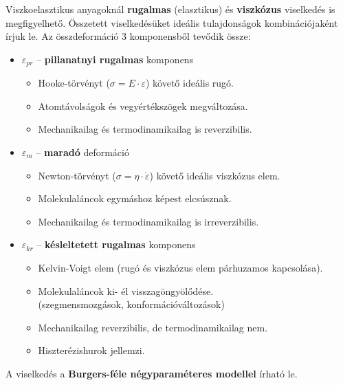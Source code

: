 \documentclass[12pt,a4paper]{article}       %
\newcounter{questionctr}
\newenvironment{question}[1]{
  \refstepcounter{questionctr}
  \begin{tcolorbox}[
    colback=gray!25,
    colbacktitle=red!10!yellow!50,
    enhanced,
    sharp corners,
    boxrule=0mm,
    frame hidden,
    breakable,
    enhanced jigsaw,
    title={\textcolor{black}{\textsc{\# \thequestionctr{} – #1}}}
  ]


}{\end{tcolorbox}}
\begin{document}
\begin{question}{
    Mutassa be a molekulaláncok mechanikai behatásra történő mozgásait. Mutassa
    be részletesen a polimerek deformációkomponenseit! Milyen viselkedési
    jelenségeket mutatnak ezek az anyagok?
  }
  Viszkoelasztikus anyagoknál \textbf{rugalmas} (elasztikus) és
  \textbf{viszkózus} viselkedés is megfigyelhető. Összetett viselkedésüket
  ideális tulajdonságok kombinációjaként írjuk le. Az összdeformáció 3
  komponensből tevődik össze:
  \begin{itemize}
    \item $\varepsilon_{pr}$ – \textbf{pillanatnyi rugalmas} komponens
          \begin{itemize}
            \item Hooke-törvényt ($\sigma = E \cdot \varepsilon$) követő
                  ideális rugó.
            \item Atomtávolságok és vegyértékszögek megváltozása.
            \item Mechanikailag és termodinamikailag is reverzibilis.
          \end{itemize}
    \item $\varepsilon_{m}$ – \textbf{maradó} deformáció
          \begin{itemize}
            \item Newton-törvényt ($\sigma = \eta \cdot \dot{\varepsilon}$)
                  követő ideális viszkózus elem.
            \item Molekulaláncok egymáshoz képest elcsúsznak.
            \item Mechanikailag és termodinamikailag is irreverzibilis.
          \end{itemize}
    \item $\varepsilon_{kr}$ – \textbf{késleltetett rugalmas} komponens
          \begin{itemize}
            \item Kelvin-Voigt elem (rugó és viszkózus elem párhuzamos
                  kapcsolása).
            \item Molekulaláncok ki- él visszagöngyölődése. \\
                  (szegmensmozgások, konformációváltozások)
            \item Mechanikailag reverzibilis, de termodinamikailag nem.
            \item Hiszterézishurok jellemzi.
          \end{itemize}
  \end{itemize}
  A viselkedés a \textbf{Burgers-féle négyparaméteres modellel} írható le.
\end{question}
\end{document}
